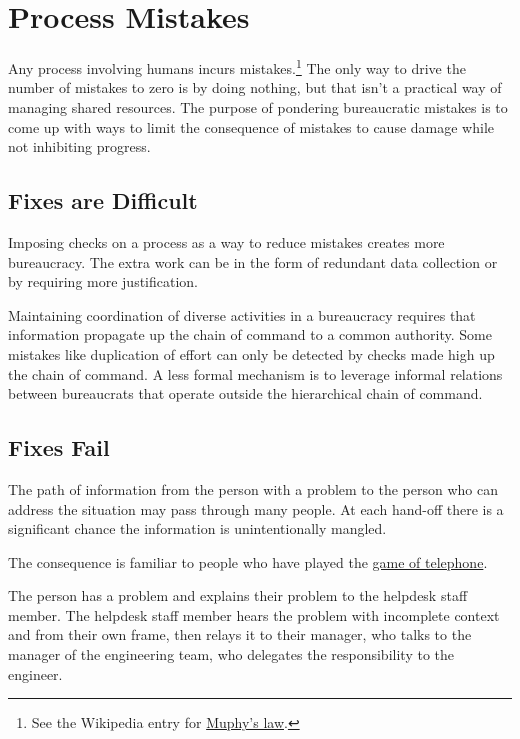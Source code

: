 \section{Process Mistakes\label{sec:process-mistakes}}

Any process involving humans incurs mistakes.\footnote{See the Wikipedia entry for \href{https://en.wikipedia.org/wiki/Murphy\%27s_law}{Muphy's law}.
} The only way to drive the number of mistakes to zero is by doing nothing, but that isn't a practical way of managing shared resources. 
The purpose of pondering bureaucratic mistakes is to come up with ways to limit the consequence of mistakes to cause damage while not inhibiting progress. 

\subsection*{Fixes are Difficult}
Imposing checks on a process as a way to  reduce mistakes creates more bureaucracy. The extra work can be in the form of redundant data collection or by requiring more justification. 

Maintaining coordination of diverse activities in a bureaucracy requires that information propagate up the chain of command to a common authority. Some mistakes like duplication of effort can only be detected by checks made high up the chain of command. A less formal mechanism is to leverage informal relations between bureaucrats that operate outside the hierarchical chain of command. 


\subsection*{Fixes Fail}
The path of information from the person with a problem to the person who can address the situation may pass through many people. At each hand-off there is a significant chance the information is unintentionally mangled. 

The consequence is familiar to people who have played the \href{https://en.wikipedia.org/wiki/Chinese_whispers\%23Game}{game of telephone}.
\begin{mdframed}[frametitle={Game of Telephone},frametitlerule=true,frametitlealignment=\centering]
The person has a problem and explains their problem to the helpdesk staff member. The helpdesk staff member hears the problem with incomplete context and from their own frame, then relays it to their manager, who talks to the manager of the engineering team, who delegates the responsibility to the engineer. 
\end{mdframed}

